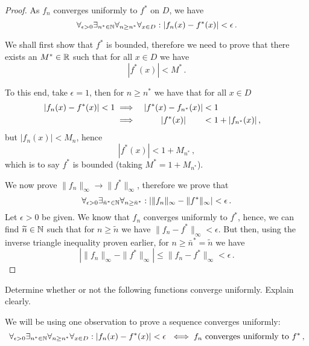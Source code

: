 \documentclass[week=10]{homework}
\newcommand*\centermathcell[1]{\omit\hfil$\displaystyle#1$\hfil\ignorespaces}
\begin{document}
\begin{questions}
\begin{parts}
\begin{proof}
				As $f_n$ converges uniformly to $f^*$ on $D$, we have
				\[
					\forall_{\epsilon > 0}\exists_{n^* \in \naturals}\forall_{n\geq n^*}\forall_{x\in D}: |f_n(x) - f^*(x)| < \epsilon\,.
				\]
				
				We shall first show that $f^*$ is bounded, therefore we need to prove that there exists an $M^* \in \mathbb{R}$ such that for all $x \in D$ we have
				\[
					|f^*(x)| < M^*\,.
				\]
				
				To this end, take $\epsilon = 1$, then for $n \geq n^*$ we have that for all $x \in D$
				\begin{alignat*}{2}
					|f_n(x) - f^*(x)| < 1 \implies&{}&\centermathcell{|f^*(x) - f_{n^*}(x)|} &< 1\\
					\implies&{}& \centermathcell{|f^*(x)|}&< 1 + |f_{n^*}(x)|\,,
				\end{alignat*} 
				but $|f_n(x)| < M_n$, hence
				\[	|f^*(x)| < 1 + M_{n^*}\,, \]
				which is to say $f^*$ is bounded (taking $M^* = 1 + M_{n^*}$).
				
				We now prove $\| f_n \|_\infty \to \| f^* \|_\infty$, therefore we prove that
				\[
					\forall_{\epsilon > 0}\exists_{\bar n^* \in \naturals}\forall_{n\geq \bar n^*}: |\|f_n\|_\infty - \|f^*\|_\infty| < \epsilon\,.
				\]
				Let $\epsilon > 0$ be given. We know that $f_n$ converges uniformly to $f^*$, hence, we can find $\widetilde n \in \mathbb{N}$ such that for $n \geq \widetilde n$ we have $\| f_n - f^* \|_\infty < \epsilon$. But then, using the inverse triangle inequality proven earlier, for $n \geq \bar n^* = \widetilde n$ we have
				\[
				|\|f_n\|_\infty - \|f^*\|_\infty| \leq \| f_n - f^* \|_\infty < \epsilon\,.
				\]
				
			\end{proof}
		\end{parts}
		
		\question
		Determine whether or not the following functions converge uniformly. Explain clearly.
		
		We will be using one observation to prove a sequence converges uniformly:
		\begin{equation} \label{Q4:unif:def}
		\forall_{\epsilon > 0}\exists_{n^* \in \naturals}\forall_{n \geq n^*}\forall_{x \in D}: |f_n(x) - f^*(x)| < \epsilon\ \iff  f_n \text{ converges uniformly to } f^*\,,
		\end{equation}
		

\end{questions}
\end{document}
